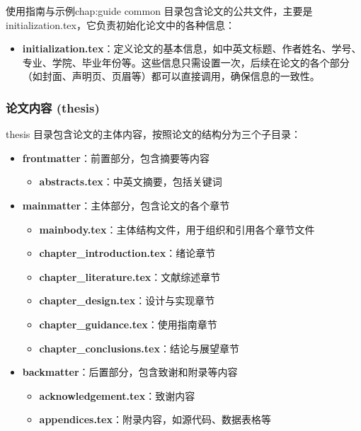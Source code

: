 \begin{cuzchapter}{使用指南与示例}{chap:guide}
    common 目录包含论文的公共文件，主要是 initialization.tex，它负责初始化论文中的各种信息：

    \begin{itemize}
        \item \textbf{initialization.tex}：定义论文的基本信息，如中英文标题、作者姓名、学号、专业、学院、毕业年份等。这些信息只需设置一次，后续在论文的各个部分（如封面、声明页、页眉等）都可以直接调用，确保信息的一致性。
    \end{itemize}

    \subsubsection{论文内容 (thesis)}\label{subsub:thesis}

    thesis 目录包含论文的主体内容，按照论文的结构分为三个子目录：

    \begin{itemize}
        \item \textbf{frontmatter}：前置部分，包含摘要等内容
            \begin{itemize}
                \item \textbf{abstracts.tex}：中英文摘要，包括关键词
            \end{itemize}

        \item \textbf{mainmatter}：主体部分，包含论文的各个章节
            \begin{itemize}
                \item \textbf{mainbody.tex}：主体结构文件，用于组织和引用各个章节文件
                \item \textbf{chapter\_introduction.tex}：绪论章节
                \item \textbf{chapter\_literature.tex}：文献综述章节
                \item \textbf{chapter\_design.tex}：设计与实现章节
                \item \textbf{chapter\_guidance.tex}：使用指南章节
                \item \textbf{chapter\_conclusions.tex}：结论与展望章节
            \end{itemize}

        \item \textbf{backmatter}：后置部分，包含致谢和附录等内容
            \begin{itemize}
                \item \textbf{acknowledgement.tex}：致谢内容
                \item \textbf{appendices.tex}：附录内容，如源代码、数据表格等
            \end{itemize}
    \end{itemize}


\end{cuzchapter}
